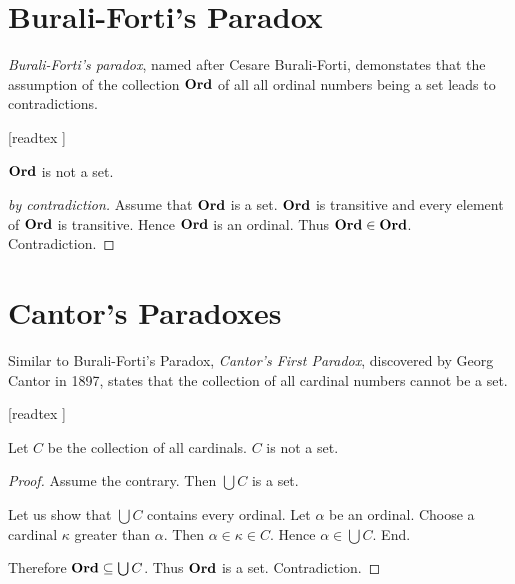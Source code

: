 \documentclass{article}
\begin{document}
  \section*{Burali-Forti's Paradox}

  \emph{Burali-Forti's paradox}, named after Cesare Burali-Forti, demonstates
  that the assumption of the collection $\textbf{Ord}$ of all all ordinal numbers being
  a set leads to contradictions.

  \begin{forthel}

    [readtex ]

  \end{forthel}

  \begin{forthel}
    \begin{theorem*}
      $\textbf{Ord}$ is not a set.
    \end{theorem*}
    \begin{proof}[by contradiction]
      Assume that $\textbf{Ord}$ is a set.
      $\textbf{Ord}$ is transitive and every element of $\textbf{Ord}$ is transitive.
      Hence $\textbf{Ord}$ is an ordinal.
      Thus $\textbf{Ord} \in \textbf{Ord}$.
      Contradiction.
    \end{proof}
  \end{forthel}


  \section*{Cantor's Paradoxes}

  Similar to Burali-Forti's Paradox, \emph{Cantor's First Paradox}, discovered
  by Georg Cantor in 1897, states that the collection of all cardinal numbers
  cannot be a set.

  \begin{forthel}

    [readtex ]

  \end{forthel}

  \begin{forthel}
    \begin{theorem*}
      Let $C$ be the collection of all cardinals.
      $C$ is not a set.
    \end{theorem*}
    \begin{proof}
      Assume the contrary.
      Then $\bigcup C$ is a set.

      Let us show that $\bigcup C$ contains every ordinal.
        Let $\alpha$ be an ordinal.
        Choose a cardinal $\kappa$ greater than $\alpha$.
        Then $\alpha \in \kappa \in C$.
        Hence $\alpha \in \bigcup C$.
      End.

      Therefore $\textbf{Ord} \subseteq \bigcup C$.
      Thus $\textbf{Ord}$ is a set.
      Contradiction.
    \end{proof}
  \end{forthel}
\end{document}
